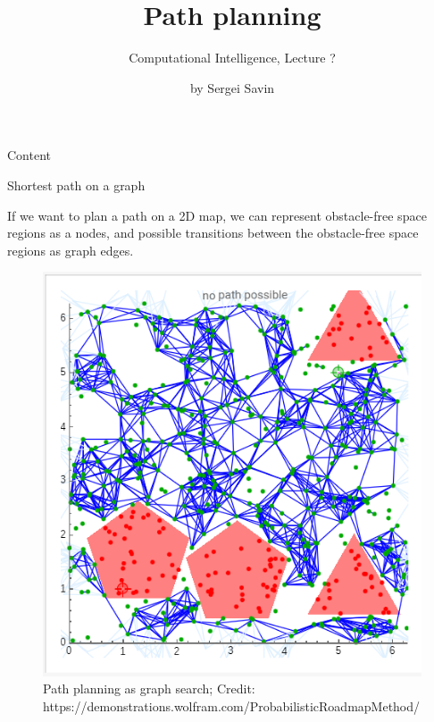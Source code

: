 \documentclass{beamer}
\title{Path planning}
\subtitle{Computational Intelligence, Lecture ?}
\author{by Sergei Savin}
\date{\mydate}
\begin{document}
\maketitle


\begin{frame}{Content}


\end{frame}



\begin{frame}{Shortest path on a graph}
	\begin{flushleft}
		
		If we want to plan a path on a 2D map, we can represent obstacle-free space regions as a nodes, and possible transitions between the obstacle-free space regions as graph edges. 
		
		\begin{figure}
			\centering
			\includegraphics[width=0.4\linewidth]{GraphPathPlanning}
			\caption{Path planning as graph search; \scriptsize{Credit: https://demonstrations.wolfram.com/ProbabilisticRoadmapMethod/}}
			\label{fig:graphpathplanning}
		\end{figure}
		
		
	\end{flushleft}
\end{frame}
\end{document}
